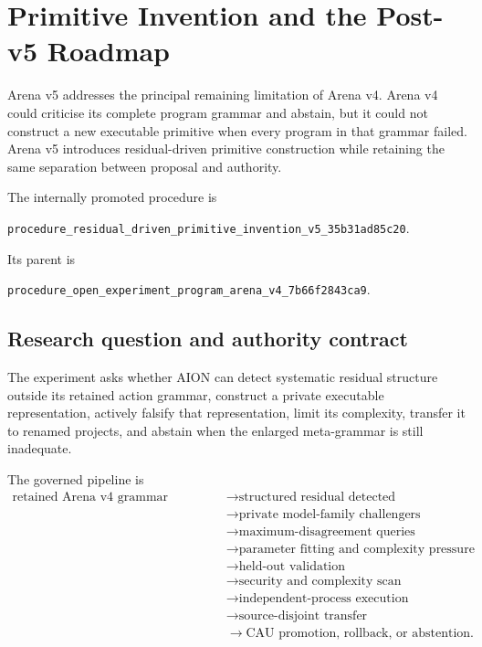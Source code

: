 
\section{Primitive Invention and the Post-v5 Roadmap}
\label{sec:arena-v5-and-roadmap}

Arena v5 addresses the principal remaining limitation of Arena v4.  Arena v4
could criticise its complete program grammar and abstain, but it could not
construct a new executable primitive when every program in that grammar failed.
Arena v5 introduces residual-driven primitive construction while retaining the
same separation between proposal and authority.

The internally promoted procedure is
\begin{center}
{\footnotesize
\texttt{procedure\_residual\_driven\_primitive\_invention\_v5\_35b31ad85c20}}.
\end{center}
Its parent is
\begin{center}
{\footnotesize
\texttt{procedure\_open\_experiment\_program\_arena\_v4\_7b66f2843ca9}}.
\end{center}


\subsection{Research question and authority contract}
\label{subsec:arena-v5-question}

The experiment asks whether AION can detect systematic residual structure
outside its retained action grammar, construct a private executable
representation, actively falsify that representation, limit its complexity,
transfer it to renamed projects, and abstain when the enlarged meta-grammar is
still inadequate.

The governed pipeline is
\begin{equation}
\begin{split}
\text{retained Arena v4 grammar exhausted}
&\rightarrow \text{structured residual detected} \\
&\rightarrow \text{private model-family challengers} \\
&\rightarrow \text{maximum-disagreement queries} \\
&\rightarrow \text{parameter fitting and complexity pressure} \\
&\rightarrow \text{held-out validation} \\
&\rightarrow \text{security and complexity scan} \\
&\rightarrow \text{independent-process execution} \\
&\rightarrow \text{source-disjoint transfer} \\
&\rightarrow \text{CAU promotion, rollback, or abstention}.
\end{split}
\label{eq:arena-v5-pipeline}
\end{equation}

